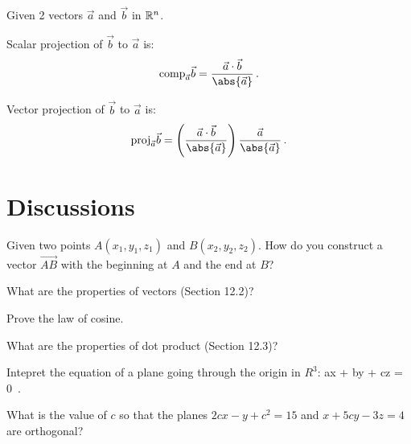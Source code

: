 \documentclass[12pt]{amsart}
\begin{document}
\begin{definition}[Projections]
	Given 2 vectors $\vec{a}$ and $\vec{b}$ in $\mathbb{R}^n$.

	Scalar projection of $\vec{b}$ to $\vec{a}$ is:
	\begin{equation*}
		\mathrm{comp}_{\vec{a}} \vec{b} = \frac{ \vec{a} \cdot \vec{b}}{\abs{\vec{a}}} \,.
	\end{equation*}

	Vector projection of $\vec{b}$ to $\vec{a}$ is:
	\begin{equation*}
		\mathrm{proj}_{\vec{a}} \vec{b} = \left(\frac{ \vec{a} \cdot \vec{b}}{\abs{\vec{a}}}\right) \frac{\vec{a}}{\abs{\vec{a}}} \,.
	\end{equation*}
\end{definition}

\section{Discussions}

\begin{question}
	Given two points $A(x_1,y_1, z_1)$ and $B(x_2, y_2, z_2)$.
	How do you construct a vector $\vec{AB}$ with the beginning at $A$ and the end at $B$?
\end{question}
\vspace{5cm}

\begin{question}
	What are the properties of vectors (Section 12.2)?

\end{question}
\vspace{5cm}

\begin{question}
	Prove the law of cosine.
\end{question}
\vspace{5cm}

\begin{question}
	What are the properties of dot product (Section 12.3)?

\end{question}
\vspace{5cm}

\begin{question}
	Intepret the equation of a plane going through the origin in $R^3$:
	ax + by + cz = 0 \,.
\end{question}
\vspace{5cm}

\begin{question}
	What is the value of $c$ so that the planes
	$2cx - y + c^2 = 15$ and $x + 5cy - 3z = 4$ are orthogonal?
\end{question}
\vspace{5cm}
\end{document}
